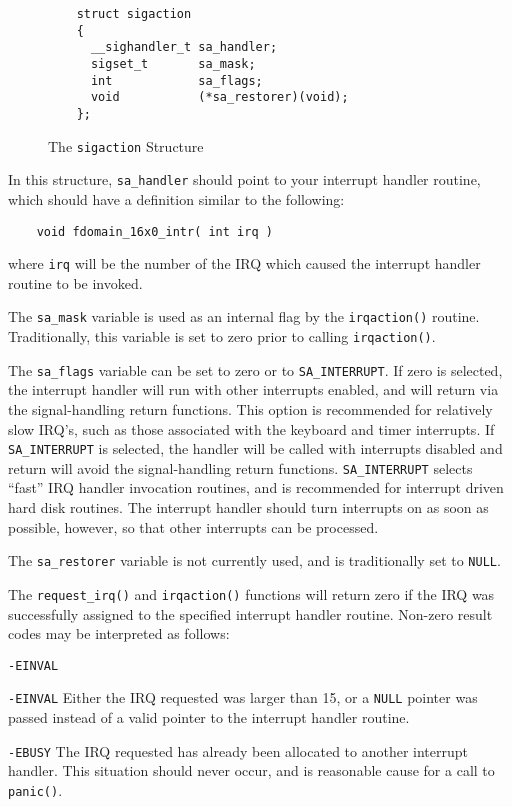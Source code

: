 \begin{figure}[hbtp]
  \leavevmode
  \begin{center}
    \begin{verbatim}
    struct sigaction
    {
      __sighandler_t sa_handler;
      sigset_t       sa_mask;
      int            sa_flags;
      void           (*sa_restorer)(void);
    };
    \end{verbatim}
    \caption{The {\tt sigaction} Structure}
    \label{fig:sigaction}
  \end{center}
\end{figure}

In this structure, \verb|sa_handler| should point to your interrupt handler
routine, which should have a definition similar to the following:
\begin{singlespace}
  \begin{center}
    \begin{verbatim}
    void fdomain_16x0_intr( int irq )
    \end{verbatim}
  \end{center}
\end{singlespace}
\noindent where \verb|irq| will be the number of the IRQ which caused the
interrupt handler routine to be invoked.

The \verb|sa_mask| variable is used as an internal flag by the
\verb|irqaction()| routine.  Traditionally, this variable is set to zero
prior to calling \verb|irqaction()|.

The \verb|sa_flags| variable can be set to zero or to
\verb|SA_INTERRUPT|\@.  If zero is selected, the interrupt handler will run
with other interrupts enabled, and will return via the signal-handling
return functions.  This option is recommended for relatively slow IRQ's,
such as those associated with the keyboard and timer interrupts.  If
\verb|SA_INTERRUPT| is selected, the handler will be called with interrupts
disabled and return will avoid the signal-handling return functions.
\verb|SA_INTERRUPT| selects ``fast'' IRQ handler invocation routines, and
is recommended for interrupt driven hard disk routines.  The interrupt
handler should turn interrupts on as soon as possible, however, so that
other interrupts can be processed.

The \verb|sa_restorer| variable is not currently used, and is traditionally
set to \verb|NULL|\@.

The \verb|request_irq()| and \verb|irqaction()| functions will return zero
if the IRQ was successfully assigned to the specified interrupt handler
routine.  Non-zero result codes may be interpreted as follows:
\begin{desc}{{\tt -EINVAL}}
\item[{\tt -EINVAL}] Either the IRQ requested was larger than 15, or a
  \verb|NULL| pointer was passed instead of a valid pointer to the
  interrupt handler routine.
\item[{\tt -EBUSY}] The IRQ requested has already been allocated to another
  interrupt handler.  This situation should never occur, and is reasonable
  cause for a call to \verb|panic()|.
\end{desc}

